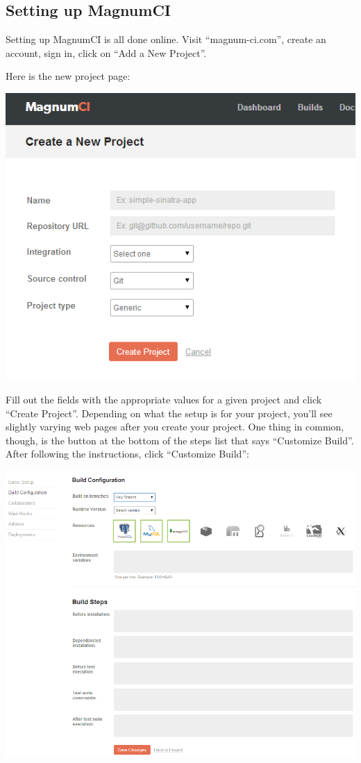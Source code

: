 \documentclass[12pt]{ucthesis}
\newenvironment{Figure}
  {\par\medskip\noindent\minipage{\linewidth}}
  {\endminipage\par\medskip}
\begin{document}
\subsection{Setting up MagnumCI}
Setting up MagnumCI is all done online. Visit ``magnum-ci.com'', create an account, sign in, click on ``Add a New Project''.

Here is the new project page:
\begin{Figure}
  \centering
  \includegraphics[width=0.75\linewidth]{magnumCI_new_project.png}
\end{Figure}

Fill out the fields with the appropriate values for a given project and click ``Create Project''. Depending on what the setup is for your project, you'll see slightly varying web pages after you create your project. One thing in common, though, is the button at the bottom of the steps list that says ``Customize Build''. After following the instructions, click ``Customize Build'':
\begin{Figure}
  \centering
  \includegraphics[width=0.75\linewidth]{magnumCI_customize_build.png}
\end{Figure}
\end{document}
